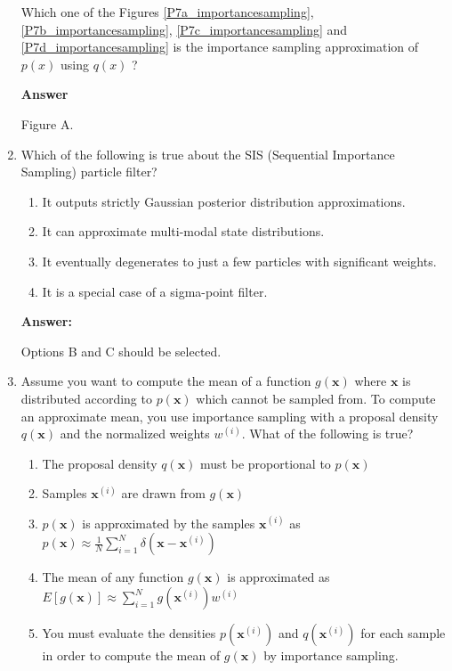 \begin{enumerate}
Which one of the Figures \ref{P7a_importancesampling}, \ref{P7b_importancesampling}, \ref{P7c_importancesampling} and \ref{P7d_importancesampling} is the importance sampling approximation of $p(x)$ using $q(x)$ ?

\textbf{Answer}

Figure A.

\item Which of the following is true about the SIS (Sequential Importance Sampling) particle filter?

\begin{enumerate}
\item It outputs strictly Gaussian posterior distribution approximations. 
\item It can approximate multi-modal state distributions. 
\item It eventually degenerates to just a few particles with significant weights. 
\item It is a special case of a sigma-point filter. 
\end{enumerate} 

\textbf{Answer:}

Options B and C should be selected.

\item Assume you want to compute the mean of a function $g(\mathbf{x})$ where $\mathbf{x}$ is distributed according to $p(\mathbf{x})$ which cannot
be sampled from. To compute an approximate mean, you use importance sampling with a proposal density $q(\mathbf{x})$ and the normalized
weights $w^{(i)}$.  What of the following is true?

\begin{enumerate}
\item The proposal density $q(\mathbf{x})$ must be proportional to $p(\mathbf{x})$
\item Samples $\mathbf{x}^{(i)}$ are drawn from $g(\mathbf{x})$
\item $p(\mathbf{x})$ is approximated by the samples $\mathbf{x}^{(i)}$ as $p(\mathbf{x}) \approx \frac{1}{N}\sum_{i=1}^{N}\delta(\mathbf{x}-\mathbf{x}^{(i)})$
\item The mean of any function $g(\mathbf{x})$ is approximated as $E[g(\mathbf{x})] \approx \sum_{i=1}^{N} g(\mathbf{x}^{(i)})w^{(i)}$
\item You must evaluate the densities $p(\mathbf{x}^{(i)})$ and $q(\mathbf{x}^{(i)})$ for each sample in order to compute the mean of $g(\mathbf{x})$ by importance sampling.
\end{enumerate}


\end{enumerate}
